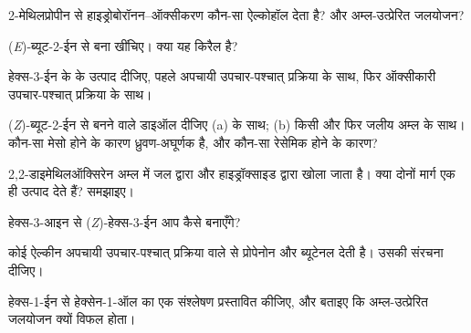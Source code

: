 \begin{exercise}[$\star$]\label{exo:b2:alkene-redox:2}
2-मेथिलप्रोपीन से हाइड्रोबोरॉनन--ऑक्सीकरण कौन-सा ऐल्कोहॉल देता है? और अम्ल-उत्प्रेरित
जलयोजन?
\end{exercise}

\begin{exercise}[$\star$]\label{exo:b2:alkene-redox:3}
(\textit{E})-ब्यूट-2-ईन से बना  खींचिए। क्या यह किरैल है?
\end{exercise}

\begin{exercise}[$\star$]\label{exo:b2:alkene-redox:4}
हेक्स-3-ईन के  के उत्पाद दीजिए, पहले अपचायी उपचार-पश्चात् प्रक्रिया के साथ, फिर
ऑक्सीकारी उपचार-पश्चात् प्रक्रिया के साथ।
\end{exercise}

\begin{exercise}[$\star\star$]\label{exo:b2:alkene-redox:5}
(\textit{Z})-ब्यूट-2-ईन से बनने वाले डाइऑल दीजिए (a)  के साथ; (b) किसी  और फिर जलीय अम्ल के साथ। कौन-सा मेसो होने के कारण ध्रुवण-अघूर्णक है, और कौन-सा
रेसेमिक होने के कारण?
\end{exercise}

\begin{exercise}[$\star\star$]\label{exo:b2:alkene-redox:6}
2,2-डाइमेथिलऑक्सिरेन अम्ल में जल द्वारा और हाइड्रॉक्साइड द्वारा खोला जाता है। क्या दोनों मार्ग
एक ही उत्पाद देते हैं? समझाइए।
\end{exercise}

\begin{exercise}[$\star\star$]\label{exo:b2:alkene-redox:7}
हेक्स-3-आइन से (\textit{Z})-हेक्स-3-ईन आप कैसे बनाएँगे?
\end{exercise}

\begin{exercise}[$\star\star$]\label{exo:b2:alkene-redox:8}
कोई ऐल्कीन  अपचायी उपचार-पश्चात् प्रक्रिया वाले  से प्रोपेनोन और ब्यूटेनल देती है।
उसकी संरचना दीजिए।
\end{exercise}

\begin{exercise}[$\star\star$]\label{exo:b2:alkene-redox:9}
हेक्स-1-ईन से हेक्सेन-1-ऑल का एक संश्लेषण प्रस्तावित कीजिए, और बताइए कि अम्ल-उत्प्रेरित जलयोजन
क्यों विफल होता।
\end{exercise}

